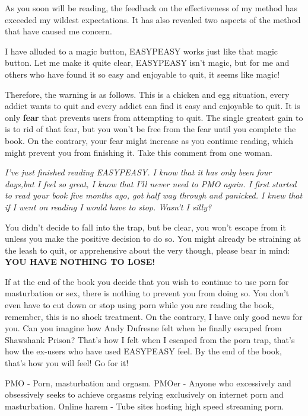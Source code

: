 \documentclass[easypeasy.tex]{subfiles}
\begin{document}
As you soon will be reading, the feedback on the effectiveness of my method has exceeded my wildest expectations. It has also revealed two aspects of the method that have caused me concern. 

I have alluded to a magic button, EASYPEASY works just like that magic button. Let me make it quite clear, EASYPEASY isn't magic, but for me and others who have found it so easy and enjoyable to quit, it seems like magic!

Therefore, the warning is as follows.
This is a chicken and egg situation, every addict wants to quit and every addict can find it easy and enjoyable to quit. It is only \textbf{fear} that prevents users from attempting to quit. The single greatest gain to is to rid of that fear, but you won't be free from the fear until you complete the book. On the contrary, your fear might increase as you continue reading, which might prevent you from finishing it. Take this comment from one woman.

\textit{I've just finished reading EASYPEASY. I know that it has only been four days,but I feel so great, I know that I'll never need to PMO again. I first started to read your book five months ago, got half way through and panicked. I knew that if I went on reading I would have to stop. Wasn't I silly?}

You didn't decide to fall into the trap, but be clear, you won't escape from it unless you make the positive decision to do so. You might already be straining at the leash to quit, or apprehensive about the very though, please bear in mind: 
\textbf{YOU HAVE NOTHING TO LOSE!}

If at the end of the book you decide that you wish to continue to use porn for masturbation or sex, there is nothing to prevent you from doing so. You don't even have to cut down or stop using porn while you are reading the book, remember, this is no shock treatment. On the contrary, I have only good news for you. Can you imagine how Andy Dufresne felt when he finally escaped from Shawshank Prison? That's how I felt when I escaped from the porn trap, that's how the ex-users who have used EASYPEASY feel. By the end of the book, that's how you will feel! Go for it!

  PMO - Porn, masturbation and orgasm.
  PMOer - Anyone who excessively and obsessively seeks to achieve orgasms relying exclusively on internet porn and masturbation.
  Online harem - Tube sites hosting high speed streaming porn.
\end{document}
